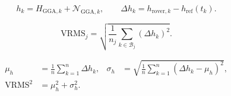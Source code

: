 \documentclass[11pt,a4paper]{article}
\numberwithin{equation}{section}
\numberwithin{figure}{section}
\begin{document}
\begin{equation}h_k=H_{\mathrm{GGA},k}+\mathcal N_{\mathrm{GGA},k},\qquad \Delta h_k=h_{\mathrm{rover},k}-h_{\mathrm{ref}}(t_k).\label{eq:en-height}\end{equation}

\begin{equation}\mathrm{VRMS}_j=\sqrt{\frac{1}{n_j}\sum_{k\in\mathcal B_j}(\Delta h_k)^2}.\label{eq:en-vrms}\end{equation}

\begin{equation}\begin{aligned}\mu_h&=\frac{1}{n}\sum_{k=1}^{n}\Delta h_k,& \sigma_h&=\sqrt{\frac{1}{n}\sum_{k=1}^{n}(\Delta h_k-\mu_h)^2},\\ \mathrm{VRMS}^2&=\mu_h^2+\sigma_h^2.\end{aligned}\label{eq:en-bias}\end{equation}
\end{document}
